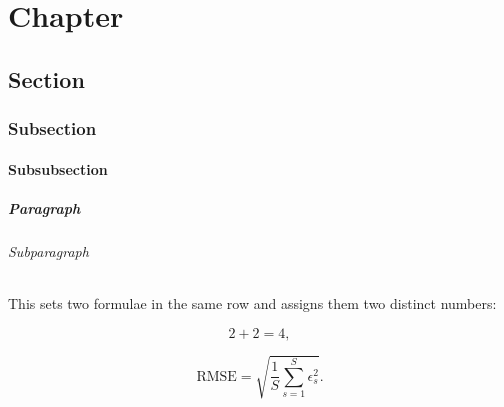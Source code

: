 \documentclass[12pt,twoside,a4paper]{report}
\begin{document}
\chapter{Chapter}
\section{Section}
\subsection{Subsection}
\subsubsection{Subsubsection}
\paragraph{Paragraph}
\subparagraph{Subparagraph}

This sets two formulae in the same row and assigns them two distinct numbers:

\noindent\begin{minipage}{0.5\linewidth}
	\begin{equation}
		2+2=4,
		\label{eq:mae}
	\end{equation}
\end{minipage}
\begin{minipage}{0.5\linewidth}
	\begin{equation}
		\text{RMSE}=\sqrt{\frac{1}{S}\sum_{s=1}^{S}\epsilon_s^2}.
		\label{eq:mae}
	\end{equation}
\end{minipage}\par\vspace{\belowdisplayskip}
\end{document}
